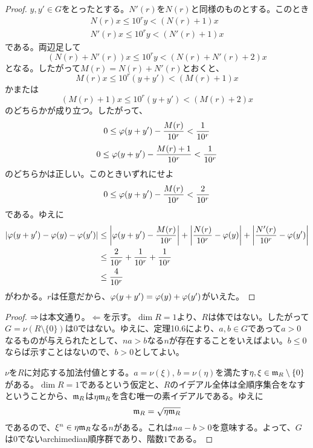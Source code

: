 \begin{proof}
  $y,y' \in G$をとったとする。$N'(r)$を$N(r)$と同様のものとする。このとき
  \begin{align*}
N(r)x \leq 10^r y < (N(r)+1)x \\
N'(r)x \leq 10^r y < (N'(r)+1)x
  \end{align*}
  である。両辺足して
  \[
(N(r)+N'(r))x \leq 10^r y < (N(r) + N'(r) + 2)x
  \]
  となる。したがって$M(r)=N(r)+N'(r)$とおくと、
  \[
  M(r)x \leq 10^r(y+y') < (M(r)+1)x
  \]
  かまたは
  \[
  (M(r)+1)x \leq 10^r(y+y') < (M(r)+2)x
  \]
  のどちらかが成り立つ。したがって、
  \[
  0 \leq {\varphi}(y+y') - \frac{M(r)}{10^r} < \frac{1}{10^r}
  \]
  \[
  0 \leq {\varphi}(y+y') - \frac{M(r)+1}{10^r} < \frac{1}{10^r}
  \]
  のどちらかは正しい。このときいずれにせよ
  \[
  0 \leq {\varphi}(y+y') - \frac{M(r)}{10^r} < \frac{2}{10^r}
  \]
  である。ゆえに
  \begin{align*}
    \left \lvert {\varphi}(y+y') - {\varphi}(y) - {\varphi}(y') \right \rvert &\leq \left \lvert {\varphi}(y+y') - \frac{M(r)}{10^r} \right \rvert + \left \lvert  \frac{N(r)}{10^r} - {\varphi}(y)  \right \rvert + \left \lvert  \frac{N'(r)}{10^r} - {\varphi}(y')  \right \rvert \\
    &\leq \frac{2}{10^r} + \frac{1}{10^r} + \frac{1}{10^r} \\
    &\leq \frac{4}{10^r}
  \end{align*}
  がわかる。$r$は任意だから、${\varphi}(y+y') = {\varphi}(y) + {\varphi}(y')$がいえた。
\end{proof}


\begin{proof}
  $\Rightarrow$は本文通り。$\Leftarrow$を示す。$\dim R = 1$より、$R$は体ではない。したがって$G = \nu(R \setminus \{0\} )$は$0$ではない。ゆえに、定理10.6により、$a,b \in G$であって$a>0$なるものが与えられたとして、$na > b$なる$n$が存在することをいえばよい。$b \leq 0$ならば示すことはないので、$b>0$としてよい。

  $\nu$を$R$に対応する加法付値とする。$a=\nu(\xi)$, $b=\nu(\eta)$を満たす$\eta , \xi \in \mathfrak{m}_R \setminus \{0\}$がある。$\dim R = 1$であるという仮定と、$R$のイデアル全体は全順序集合をなすということから、$\mathfrak{m}_R$は$\eta \mathfrak{m}_R$を含む唯一の素イデアルである。ゆえに
  \[
  \mathfrak{m}_R = \sqrt{\eta \mathfrak{m}_R}
  \]
  であるので、$\xi^n \in \eta \mathfrak{m}_R$なる$n$がある。これは$na - b > 0$を意味する。よって、$G$は$0$でないarchimedian順序群であり、階数$1$である。
\end{proof}
